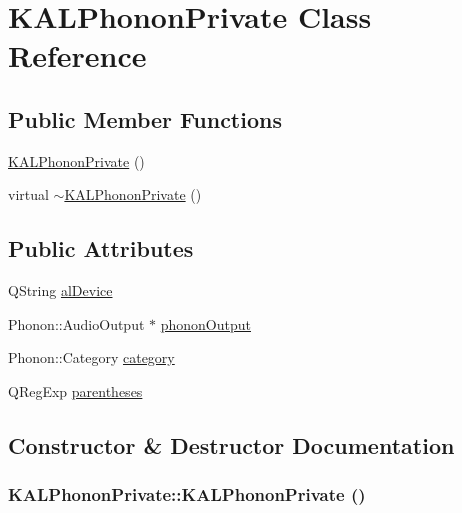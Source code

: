 \hypertarget{class_k_a_l_phonon_private}{
\section{KALPhononPrivate Class Reference}
\label{class_k_a_l_phonon_private}
}
\subsection*{Public Member Functions}
\begin{CompactItemize}
\item 
\hyperlink{class_k_a_l_phonon_private_930d884c333b0249602c9815f0670e86}{KALPhononPrivate} ()
\item 
virtual \hyperlink{class_k_a_l_phonon_private_775f32e1dd46bf599abcb912977f8598}{$\sim$KALPhononPrivate} ()
\end{CompactItemize}
\subsection*{Public Attributes}
\begin{CompactItemize}
\item 
QString \hyperlink{class_k_a_l_phonon_private_3b0ba12a82466c11a8ae856a556ecd1b}{alDevice}
\item 
Phonon::AudioOutput $\ast$ \hyperlink{class_k_a_l_phonon_private_00ed2a3728bd58dbbfa1fac3eed1a222}{phononOutput}
\item 
Phonon::Category \hyperlink{class_k_a_l_phonon_private_a70c7137cc8b53ad13d280cf7a704102}{category}
\item 
QRegExp \hyperlink{class_k_a_l_phonon_private_785b4d74d79509777a8ec902e794442f}{parentheses}
\end{CompactItemize}


\subsection{Constructor \& Destructor Documentation}
\hypertarget{class_k_a_l_phonon_private_930d884c333b0249602c9815f0670e86}{
\subsubsection[{KALPhononPrivate}]{\setlength{\rightskip}{0pt plus 5cm}KALPhononPrivate::KALPhononPrivate ()}}
\label{class_k_a_l_phonon_private_930d884c333b0249602c9815f0670e86}


